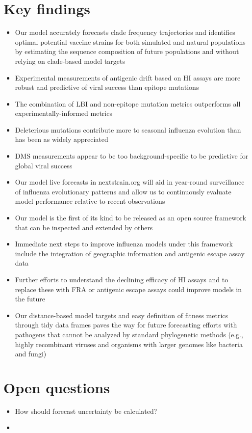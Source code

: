 \section*{Key findings}

\begin{itemize}
\item{Our model accurately forecasts clade frequency trajectories and identifies optimal potential vaccine strains for both simulated and natural populations by estimating the sequence composition of future populations and without relying on clade-based model targets}
\item{Experimental measurements of antigenic drift based on HI assays are more robust and predictive of viral success than epitope mutations}
\item{The combination of LBI and non-epitope mutation metrics outperforms all experimentally-informed metrics}
\item{Deleterious mutations contribute more to seasonal influenza evolution than has been as widely appreciated}
\item{DMS measurements appear to be too background-specific to be predictive for global viral success}
\item{Our model live forecasts in nextstrain.org will aid in year-round surveillance of influenza evolutionary patterns and allow us to continuously evaluate model performance relative to recent observations}
\item{Our model is the first of its kind to be released as an open source framework that can be inspected and extended by others}
\item{Immediate next steps to improve influenza models under this framework include the integration of geographic information and antigenic escape assay data}
\item{Further efforts to understand the declining efficacy of HI assays and to replace these with FRA or antigenic escape assays could improve models in the future}
\item{Our distance-based model targets and easy definition of fitness metrics through tidy data frames paves the way for future forecasting efforts with pathogens that cannot be analyzed by standard phylogenetic methods (e.g., highly recombinant viruses and organisms with larger genomes like bacteria and fungi)}
\end{itemize}

\section*{Open questions}

\begin{itemize}
\item{How should forecast uncertainty be calculated? }
\item{}
\end{itemize}
